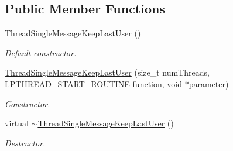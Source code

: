 \subsection*{Public Member Functions}
\begin{DoxyCompactItemize}
\item 
\hypertarget{class_thread_single_message_keep_last_user_aa425df435f95c738e8dfd4ff23b378d5}{
\hyperlink{class_thread_single_message_keep_last_user_aa425df435f95c738e8dfd4ff23b378d5}{ThreadSingleMessageKeepLastUser} ()}
\label{class_thread_single_message_keep_last_user_aa425df435f95c738e8dfd4ff23b378d5}

\begin{DoxyCompactList}\small\item\em Default constructor. \item\end{DoxyCompactList}\item 
\hyperlink{class_thread_single_message_keep_last_user_a81db1c2dcf167c58121d9349014ba38f}{ThreadSingleMessageKeepLastUser} (size\_\-t numThreads, LPTHREAD\_\-START\_\-ROUTINE function, void $\ast$parameter)
\begin{DoxyCompactList}\small\item\em Constructor. \item\end{DoxyCompactList}\item 
\hypertarget{class_thread_single_message_keep_last_user_a5095a7f86643a4eacee9121dfe125bc4}{
virtual \hyperlink{class_thread_single_message_keep_last_user_a5095a7f86643a4eacee9121dfe125bc4}{$\sim$ThreadSingleMessageKeepLastUser} ()}
\label{class_thread_single_message_keep_last_user_a5095a7f86643a4eacee9121dfe125bc4}

\begin{DoxyCompactList}\small\item\em Destructor. \item\end{DoxyCompactList}\end{DoxyCompactItemize}
